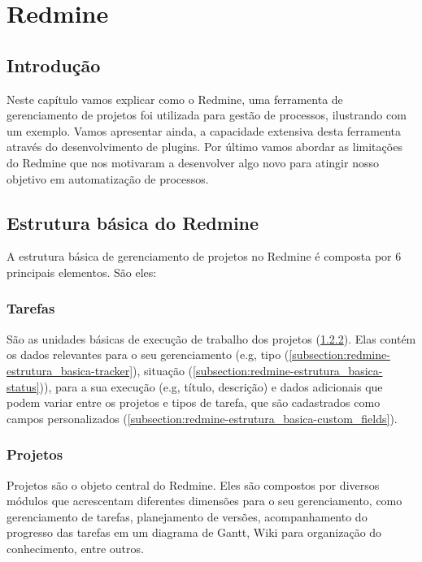 \chapter{Redmine}\label{chp:redmine}

\section{Introdução}\label{sec:redmine-introducao}
Neste capítulo vamos explicar como o Redmine, uma ferramenta de gerenciamento de projetos foi utilizada para gestão de processos, ilustrando com um exemplo. Vamos apresentar ainda, a capacidade extensiva desta ferramenta através do desenvolvimento de plugins. Por último vamos abordar as limitações do Redmine que nos motivaram a desenvolver algo novo para atingir nosso objetivo em automatização de processos.

\section{Estrutura básica do Redmine}\label{sec:redmine-estrutura_basica}

A estrutura básica de gerenciamento de projetos no Redmine é composta por 6 principais elementos. São eles:

\subsection{Tarefas}\label{subsection:redmine-estrutura_basica-tarefa}

São as unidades básicas de execução de trabalho dos projetos (\ref{subsection:redmine-estrutura_basica-projeto}). Elas contém os dados relevantes para o seu gerenciamento (e.g, tipo (\ref{subsection:redmine-estrutura_basica-tracker}), situação (\ref{subsection:redmine-estrutura_basica-status})), para a sua execução (e.g, título, descrição) e dados adicionais que podem variar entre os projetos e tipos de tarefa, que são cadastrados como campos personalizados (\ref{subsection:redmine-estrutura_basica-custom_fields}).  

\subsection{Projetos}\label{subsection:redmine-estrutura_basica-projeto}

Projetos são o objeto central do Redmine. Eles são compostos por diversos módulos que acrescentam diferentes dimensões para o seu gerenciamento, como gerenciamento de tarefas, planejamento de versões, acompanhamento do progresso das tarefas em um diagrama de Gantt, Wiki para organização do conhecimento, entre outros. 

